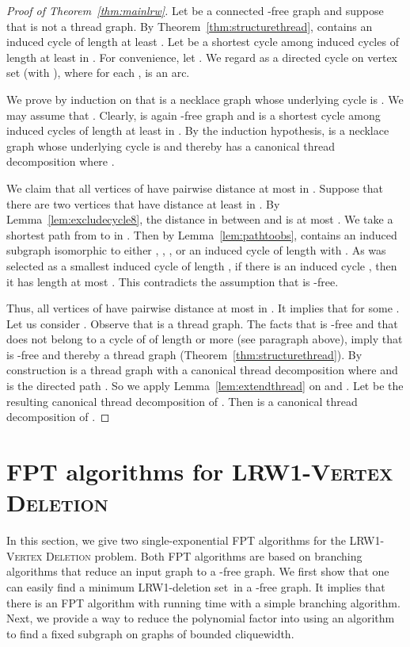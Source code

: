 \documentclass[11pt]{article}
\theoremstyle{remark}
\newcommand\house{}
\newcommand\gem{}
\newcommand\domino{}
\newcommand{\LRWD}{\textsc{LRW1-Vertex Deletion} }
\newcommand{\DEL}{LRW1-deletion set}
\begin{document}
\begin{proof}[Proof of Theorem~\ref{thm:mainlrw}]
Let  be a connected -free graph and suppose that  is not a thread graph. By Theorem~\ref{thm:structurethread},  contains an induced cycle of length at least . Let  be a shortest cycle among induced cycles of length at least  in . For convenience, let . We regard  as a directed cycle on vertex set  (with ), where for each ,  is an arc. 

We prove by induction on  that  is a necklace graph whose underlying cycle is . We may assume that . 
Clearly,  is again -free graph and
 is a shortest cycle among induced cycles of length at least  in .  By the induction hypothesis, 
 is a necklace graph whose underlying cycle is  and thereby has a canonical thread decomposition  where .


We claim that all vertices of  have pairwise distance at most  in .
Suppose that there are two vertices  that have distance at least  in . 
By Lemma~\ref{lem:excludecycle8}, the distance in  between  and  is at most . 
We take a shortest path  from  to  in .
Then by Lemma~\ref{lem:pathtoobs}, 
 contains an induced subgraph isomorphic to either \house, \gem, \domino, or an induced cycle  of length  with .
As  was selected as a smallest induced cycle of length , if there is an induced cycle , then it has length at most . This contradicts the assumption that  is -free.






Thus, all vertices of  have pairwise distance at most  in . It implies that  for some .  Let us consider . Observe that  is a thread graph. The facts that  is -free and that  does not belong to a cycle of  of length  or more (see paragraph above), imply that  is -free and thereby a thread graph (Theorem~\ref{thm:structurethread}). By construction  is a thread graph with a canonical thread decomposition  where  and  is the directed path . So we apply Lemma~\ref{lem:extendthread} on  and . Let  be the resulting canonical thread decomposition of . Then  is a canonical thread decomposition of .
\end{proof}






\section{FPT algorithms for \LRWD}\label{sec:fptthreaddel}

In this section, we give two single-exponential FPT algorithms for the \LRWD problem.
Both FPT algorithms are based on branching algorithms that reduce an input graph to a -free graph.
We first show that one can easily find a minimum \DEL\ in a -free graph.
It implies that there is an FPT algorithm with running time  with a simple branching algorithm.
Next, we provide a way to reduce the polynomial factor  into  using an algorithm to find a fixed subgraph on graphs of bounded cliquewidth.
  
\end{document}
